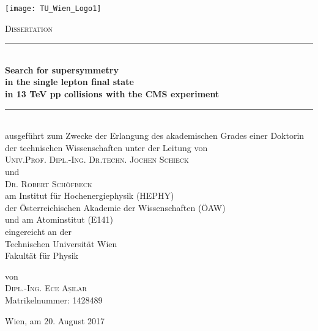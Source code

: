 \newpage

\begin{titlepage}


\thispagestyle{empty}


\vspace{-1cm} 

\texttt{[image: TU\_Wien\_Logo1]}

\vspace{1cm}

{\huge \textsc{Dissertation}}\\[0.7cm]

\rule{\linewidth}{0.5mm} \\[0.4cm]

{ \huge \bfseries 
Search for supersymmetry \\[0.1cm]
 in the single lepton final state \\[0.1cm]
 in 13 TeV pp collisions with the CMS experiment \\[0.4cm]
}

\rule{\linewidth}{0.5mm} \\[1.0cm]

ausgef\"uhrt zum Zwecke der Erlangung des akademischen Grades einer Doktorin der technischen Wissenschaften unter der Leitung von\\[0.2cm]

\textsc{Univ.Prof. Dipl.-Ing. Dr.techn. Jochen Schieck}\\[0.2cm]
und \\[0.2cm]
\textsc{Dr. Robert Sch\"ofbeck} \\[0.3cm]

am Institut f\"ur Hochenergiephysik (HEPHY) \\
der \"Osterreichischen Akademie der Wissenschaften (\"OAW) \\
und am Atominstitut (E141)\\[0.5cm]
 
eingereicht an der\\
{\sc Technischen Universit\"at Wien\\ Fakult\"at f\"ur Physik} 
 
von\\[0.2cm]

\textsc{Dipl.-Ing. Ece A\d{s}ılar}\\
Matrikelnummer: 1428489\\[0.5cm]

\vfill %

Wien, am 20. August 2017


\newpage
\end{titlepage}